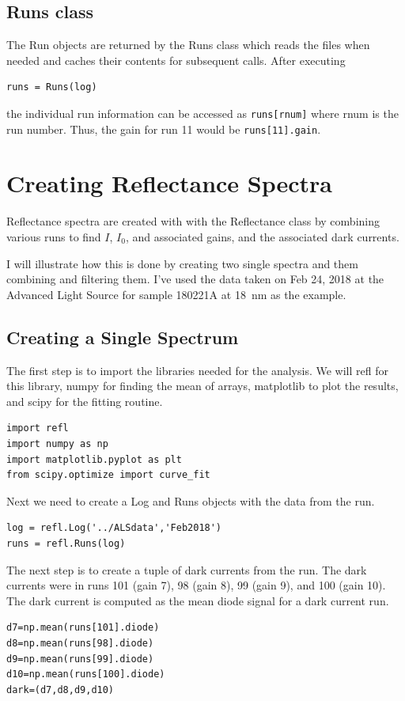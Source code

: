 \documentclass[english]{scrartcl}
\begin{document}
\subsection{Runs class}
The Run objects are returned by the Runs class which reads the files
when needed and caches their contents for subsequent calls. After executing
\begin{lstlisting}
runs = Runs(log)
\end{lstlisting}
the individual run information can be accessed as \texttt{runs[rnum]} where
rnum is the run number. Thus, the gain for run 11 would be \texttt{runs[11].gain}.

\section{Creating Reflectance Spectra}
Reflectance spectra are created with with the Reflectance class by combining
various runs to find $I$, $I_0$, and associated gains, and the associated
dark currents.

I will illustrate how this is done by creating two single spectra and them combining
and filtering them. I've used the data taken on Feb 24, 2018 at the
Advanced Light Source for sample 180221A at 18~nm as the example.

\subsection{Creating a Single Spectrum}

The first step is to import the libraries needed for the analysis. We will
refl for this library, numpy for finding the mean of arrays, matplotlib
to plot the results, and scipy for the fitting routine.
\begin{lstlisting}
import refl
import numpy as np
import matplotlib.pyplot as plt
from scipy.optimize import curve_fit
\end{lstlisting}
Next we need to create a Log and Runs objects with the data from the run.
\begin{lstlisting}
log = refl.Log('../ALSdata','Feb2018')
runs = refl.Runs(log)
\end{lstlisting}
The next step is to create a tuple of dark currents from the run. The dark
currents were in runs 101 (gain 7), 98 (gain 8), 99 (gain 9), and 100 (gain 10).
The dark current is computed as the mean diode signal for a dark current run.
\begin{lstlisting}
d7=np.mean(runs[101].diode)
d8=np.mean(runs[98].diode)
d9=np.mean(runs[99].diode)
d10=np.mean(runs[100].diode)
dark=(d7,d8,d9,d10)
\end{lstlisting}
\end{document}
